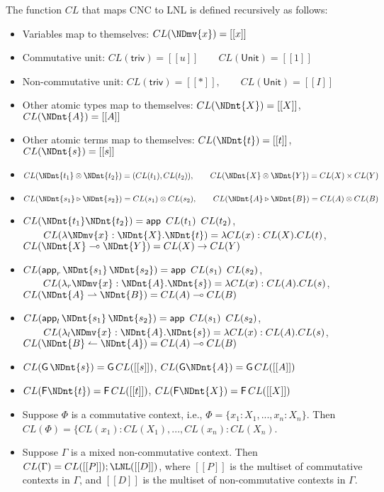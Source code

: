 \begin{definition}
  The function $CL$ that maps CNC to LNL is defined recursively as follows:
  \begin{itemize}
  \item Variables map to themselves: $CL(\NDmv{x}) = [[x]]$
  \item Commutative unit: $CL( \mathsf{triv} ) = [[u]] \qquad CL( \mathsf{Unit} ) = [[1]]$
  \item Non-commutative unit: $CL( \mathsf{triv} ) = [[*]], \qquad CL( \mathsf{Unit} ) = [[I]]$
  \item Other atomic types map to themselves: $CL(\NDnt{X}) = [[X]]$,
        $CL(\NDnt{A}) = [[A]]$
  \item Other atomic terms map to themselves: $CL(\NDnt{t}) = [[t]]$,
        $CL(\NDnt{s}) = [[s]]$
  \item $CL(\NDnt{t_{{\mathrm{1}}}}  \otimes  \NDnt{t_{{\mathrm{2}}}}) = (CL(t_1),CL(t_2)), \qquad CL(\NDnt{X}  \otimes  \NDnt{Y})=CL(X)\times CL(Y) $
  \item $CL(\NDnt{s_{{\mathrm{1}}}}  \triangleright  \NDnt{s_{{\mathrm{2}}}}) = CL(s_1)\otimes CL(s_2), \qquad CL(\NDnt{A}  \triangleright  \NDnt{B})=CL(A)\otimes CL(B)$
  \item $CL( \NDnt{t_{{\mathrm{1}}}}   \NDnt{t_{{\mathrm{2}}}} ) = \mathsf{app}\,\,\,CL(t_1)\,\,\,CL(t_2)$,
        $\qquad CL( \lambda  \NDmv{x}  :  \NDnt{X} . \NDnt{t} ) = \lambda CL(x):CL(X).CL(t)$,\\
        $CL(\NDnt{X}  \multimap  \NDnt{Y}) = CL(X) \rightarrow CL(Y)$
  \item $CL( \mathsf{app}_r\, \NDnt{s_{{\mathrm{1}}}} \, \NDnt{s_{{\mathrm{2}}}} ) = \mathsf{app}\,\,\,CL(s_1)\,\,\,CL(s_2)$,
        $\qquad CL( \lambda_r  \NDmv{x}  :  \NDnt{A} . \NDnt{s} ) = \lambda CL(x):CL(A).CL(s)$,\\
        $CL(\NDnt{A}  \rightharpoonup  \NDnt{B}) = CL(A) \multimap CL(B)$
  \item $CL( \mathsf{app}_l\, \NDnt{s_{{\mathrm{1}}}} \, \NDnt{s_{{\mathrm{2}}}} ) = \mathsf{app}\,\,\,CL(s_1)\,\,\,CL(s_2)$,
        $\qquad CL( \lambda_l  \NDmv{x}  :  \NDnt{A} . \NDnt{s} ) = \lambda CL(x):CL(A).CL(s)$,\\
        $CL(\NDnt{B}  \leftharpoonup  \NDnt{A}) = CL(A) \multimap CL(B)$
  \item $CL( \mathsf{G}\, \NDnt{s} ) = \mathsf{G}\,CL([[s]])$, \qquad $CL( \mathsf{G} \NDnt{A} ) = \mathsf{G}\,CL([[A]])$
  \item $CL( \mathsf{F} \NDnt{t} ) = \mathsf{F}\,CL([[t]])$, \qquad $CL( \mathsf{F} \NDnt{X} ) = \mathsf{F}\,CL([[X]])$
  \item Suppose $\Phi$ is a commutative context, i.e.,
        $\Phi=\{x_1:X_1,...,x_n:X_n\}$. Then \\
        $CL(\Phi)=\{CL(x_1):CL(X_1),...,CL(x_n):CL(X_n)$.
  \item Suppose $\Gamma$ is a mixed non-commutative context. Then
        $CL(\Gamma)=CL([[P]]);\LNL([[D]])$, where $[[P]]$ is the multiset of
        commutative contexts in $\Gamma$, and $[[D]]$ is the multiset of
        non-commutative contexts in $\Gamma$.
  \end{itemize}
\end{definition}

